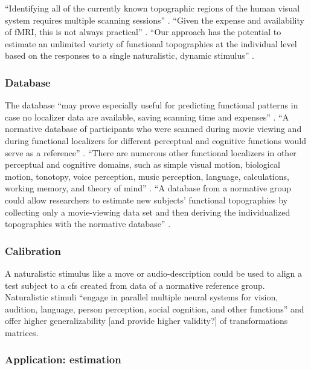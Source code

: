 ``Identifying all of the currently known topographic regions of the human visual
system requires multiple scanning sessions'' \citep{wang2015probabilistic}.
%
``Given the expense and availability of fMRI, this is not always practical''
\citep{wang2015probabilistic}.
%
``Our approach has the potential to estimate an unlimited variety of functional
topographies at the individual level based on the responses to a single
naturalistic, dynamic stimulus'' \citep{jiahui2020predicting}.



\subsubsection{Database}
%
The database ``may prove especially useful for predicting functional patterns in
case no localizer data are available, saving scanning time and expenses''
\citep{rosenke2021probabilistic}.
%
``A normative database of participants who were scanned during movie viewing and
during functional localizers for different perceptual and cognitive functions
would serve as a reference'' \citep{jiahui2020predicting}.
%
``There are numerous other functional localizers in other perceptual and
cognitive domains, such as simple visual motion, biological motion, tonotopy,
voice perception, music perception, language, calculations, working memory, and
theory of mind'' \citep{jiahui2020predicting}.
%
``A database from a normative group could allow researchers to estimate new
subjects' functional topographies by collecting only a movie-viewing data set
and then deriving the individualized topographies with the normative database''
\citep{jiahui2020predicting}.



\subsubsection{Calibration}
%
A naturalistic stimulus like a move or audio-description could be used to align
a test subject to a \ac{cfs} created from data of a normative reference group.
%
Naturalistic stimuli ``engage in parallel multiple neural systems for vision,
audition, language, person perception, social cognition, and other functions''
\citep{jiahui2020predicting} and offer higher generalizability [and provide
higher validity?] of transformations matrices.



\subsubsection{Application: estimation}

